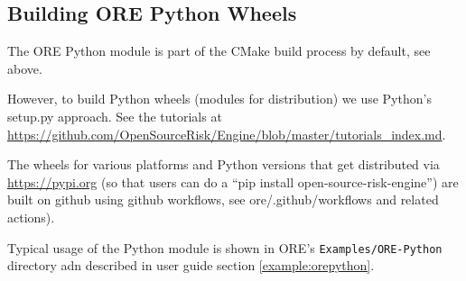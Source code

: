 
\subsection{Building ORE Python Wheels}\label{sec:oreswig}

The ORE Python module is part of the CMake build process by default, see above.

However, to build Python wheels (modules for distribution) we use Python's setup.py approach.
See the tutorials at \url{https://github.com/OpenSourceRisk/Engine/blob/master/tutorials_index.md}.

The wheels for various platforms and Python versions that get distributed via \url{https://pypi.org} (so that users can
do a ``pip install open-source-risk-engine'') are built on github using github workflows, see ore/.github/workflows and related actions).

\medskip
Typical usage of the Python module is shown in ORE's {\tt Examples/ORE-Python} directory adn described in user guide section
\ref{example:orepython}.

